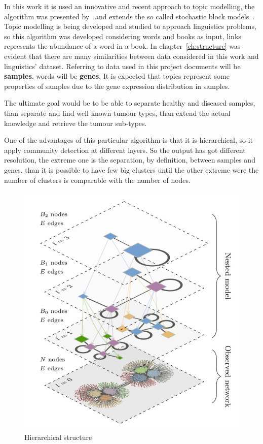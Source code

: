 In this work it is used an innovative and recent approach to topic modelling, the algorithm was presented by~\cite{gerlach2018network} and extends the so called stochastic block models~\cite{Holland1983}. 
Topic modelling is being developed and studied to approach linguistics problems, so this algorithm was developed considering words and books as input, links represents the abundance of a word in a book. In chapter~\ref{ch:structure} was evident that there are many similarities between data considered in this work and linguistics' dataset. Referring to data used in this project documents will be \textbf{samples}, words will be \textbf{genes}.
It is expected that topics represent some properties of samples due to the gene expression distribution in samples.

The ultimate goal would be to be able to separate healthy and diseased samples, than separate and find well known tumour types, than extend the actual knowledge and retrieve the tumour sub-types.

One of the advantages of this particular algorithm is that it is hierarchical, so it apply community detection at different layers. So the output has got different resolution, the extreme one is the separation, by definition, between samples and genes, than it is possible to have few big clusters until the other extreme were the number of clusters is comparable with the number of nodes.
\begin{figure}[htb!]
  \centering
  \includegraphics[width=0.6\linewidth]{pictures/topic/peixioto_hierarchic.jpg}
  \caption{Hierarchical structure}
  \label{fig:topic_peixioto_hierarchic}
\end{figure}

